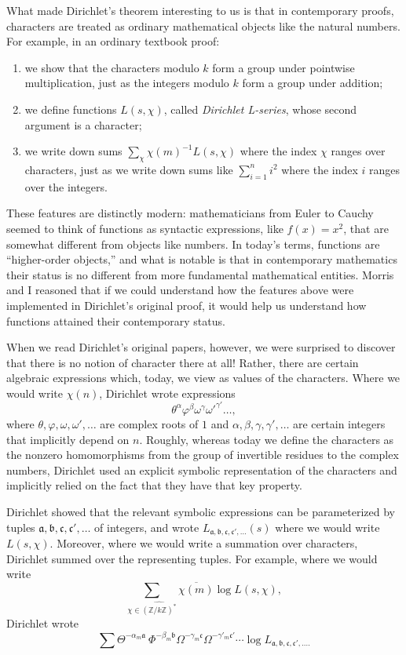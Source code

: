 \documentclass[11pt]{article}
\newcommand{\ph}{\varphi}
\begin{document}
What made Dirichlet's theorem interesting to us is that in contemporary proofs, characters are treated as ordinary mathematical objects like the natural numbers. For example, in an ordinary textbook proof:
\begin{enumerate}
\item we show that the characters modulo $k$ form a group under pointwise multiplication, just as the integers modulo $k$ form a group under addition;
\item we define functions $L(s, \chi)$, called \emph{Dirichlet L-series}, whose second argument is a character;
\item we write down sums $\sum_\chi \chi(m)^{-1} L(s, \chi)$ where the index $\chi$ ranges over characters, just as we write down sums like $\sum_{i = 1}^{n} i^2$ where the index $i$ ranges over the integers.
\end{enumerate}
These features are distinctly modern: mathematicians from Euler to Cauchy seemed to think of functions as syntactic expressions, like $f(x) = x^2$, that are somewhat different from objects like numbers. In today's terms, functions are ``higher-order objects,'' and what is notable is that in contemporary mathematics their status is no different from more fundamental mathematical entities. Morris and I reasoned that if we could understand how the features above were implemented in Dirichlet's original proof, it would help us understand how functions attained their contemporary status. 

When we read Dirichlet's original papers, however, we were surprised to discover that there is no notion of character there at all! Rather, there are certain algebraic expressions which, today, we view as values of the characters. Where we would write $\chi(n)$, Dirichlet wrote expressions
\[
\theta^\alpha \ph^\beta \omega^\gamma \omega'^{\gamma'} \ldots,
\]
where $\theta, \ph, \omega, \omega', \ldots$ are complex roots of $1$ and $\alpha, \beta, \gamma, \gamma', \ldots$ are certain integers that implicitly depend on $n$. Roughly, whereas today we define the characters as the nonzero homomorphisms from the group of invertible residues to the complex numbers, Dirichlet used an explicit symbolic representation of the characters and implicitly relied on the fact that they have that key property.

Dirichlet showed that the relevant symbolic expressions can be parameterized by tuples $\mathfrak{a}, \mathfrak{b}, \mathfrak{c}, \mathfrak{c}', \ldots$ of integers, and wrote $L_{\mathfrak{a}, \mathfrak{b}, \mathfrak{c}, \mathfrak{c}',\ldots}(s)$ where we would write $L(s,\chi)$. Moreover, where we would write a summation over characters, Dirichlet summed over the representing tuples. For example, where we would write
\[
\sum_{\chi \in \widehat{(\mathbb{Z} / k \mathbb{Z})^*}}\overline{\chi(m)}\log L(s, \chi),
\]
Dirichlet wrote 
\[
\sum \Theta^{-\alpha_{m}\mathfrak{a}}\ \Phi^{-\beta_{m}\mathfrak{b}}\Omega^{-\gamma_{m}\mathfrak{c}}\Omega^{-\gamma'_{m}\mathfrak{c}'} \cdots \log L_{\mathfrak{a},\mathfrak{b},\mathfrak{c},\mathfrak{c}', \ldots.}
\]
\end{document}
